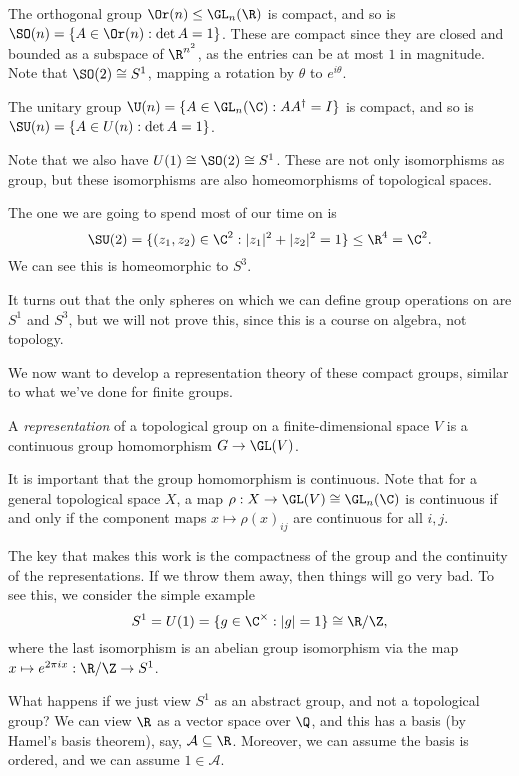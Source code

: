 \documentclass[a4paper]{article}
\begin{document}
\begin{eg}
  The orthogonal group $\Or(n) \leq \GL_n(\R)$ is compact, and so is $\SO(n) = \{A \in \Or(n) : \det A = 1\}$. These are compact since they are closed and bounded as a subspace of $\R^{n^2}$, as the entries can be at most $1$ in magnitude. Note that $\SO(2) \cong S^1$, mapping a rotation by $\theta$ to $e^{i\theta}$.
\end{eg}

\begin{eg}
  The unitary group $\U(n) = \{A \in \GL_n(\C): AA^\dagger = I\}$ is compact, and so is $\SU(n) =\{A \in U(n): \det A = 1\}$.
\end{eg}

Note that we also have $U(1) \cong \SO(2) \cong S^1$. These are not only isomorphisms as group, but these isomorphisms are also homeomorphisms of topological spaces.

The one we are going to spend most of our time on is
\[
  \SU(2) = \{(z_1, z_2) \in \C^2: |z_1|^2 + |z_2|^2 = 1\} \leq \R^4 = \C^2.
\]
We can see this is homeomorphic to $S^3$.

It turns out that the only spheres on which we can define group operations on are $S^1$ and $S^3$, but we will not prove this, since this is a course on algebra, not topology.

We now want to develop a representation theory of these compact groups, similar to what we've done for finite groups.

\begin{defi}
  A \emph{representation} of a topological group on a finite-dimensional space $V$ is a continuous group homomorphism $G \to \GL(V)$.
\end{defi}
It is important that the group homomorphism is continuous. Note that for a general topological space $X$, a map $\rho: X \to \GL(V) \cong \GL_n(\C)$ is continuous if and only if the component maps $x \mapsto \rho(x)_{ij}$ are continuous for all $i, j$.

The key that makes this work is the compactness of the group and the continuity of the representations. If we throw them away, then things will go very bad. To see this, we consider the simple example
\[
  S^1 = U(1) = \{g \in \C^\times : |g| = 1\} \cong \R/\Z,
\]
where the last isomorphism is an abelian group isomorphism via the map $x \mapsto e^{2 \pi ix}: \R/\Z \to S^1$.

What happens if we just view $S^1$ as an abstract group, and not a topological group? We can view $\R$ as a vector space over $\Q$, and this has a basis (by Hamel's basis theorem), say, $\mathcal{A} \subseteq \R$. Moreover, we can assume the basis is ordered, and we can assume $1 \in \mathcal{A}$.
\end{document}
